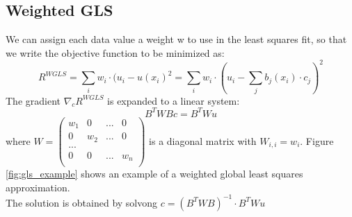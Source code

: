 \subsection{Weighted GLS}
We can assign each data value a weight w to use in the least squares fit, so that we write the objective function to be minimized as:
\begin{equation}
	R^{WGLS} = \sum_i{w_i \cdot (u_i - u(x_i)^2} = \sum_i{w_i \cdot (u_i - \sum_j{b_j(x_i)\cdot c_j})^2}
\end{equation}
The gradient $\nabla_c R^{WGLS}$ is expanded to a linear system:
\begin{equation}
	B^TWBc = B^TWu
\end{equation}
where $W = 
\begin{pmatrix}
	w_1 & 0 	& ... & 0\\
	0 	& w_2 	& ... & 0\\
	...\\
	0 	& 0 	& ... & w_n\\
\end{pmatrix}$ is a diagonal matrix with $W_{i,i} = w_i$. Figure \ref{fig:gls_example} shows an example of a weighted global least squares approximation.\\
The solution is obtained by solvong $c = (B^TWB)^{-1}\cdot B^TWu$

